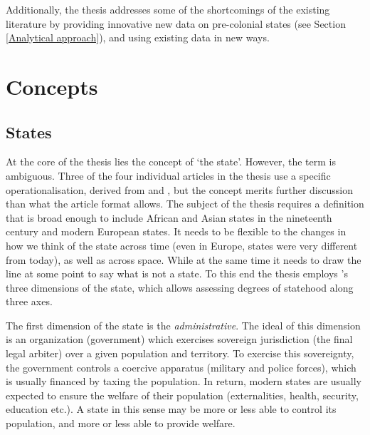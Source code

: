 Additionally, the thesis addresses some of the shortcomings of the existing
literature by providing innovative new data on pre-colonial states (see Section
\ref{Analytical approach}), and using existing data in new ways.

\section{Concepts} \label{Concepts}

\subsection{States} \label{States}

At the core of the thesis lies the concept of `the state'. However, the term is
ambiguous. Three of the four individual articles in the thesis use a specific
operationalisation, derived from \citet{Butcher2019} and \citet{Butcher2017},
but the concept merits further discussion than what the article format allows.
The subject of the thesis requires a definition that is broad enough to include
African and Asian states in the nineteenth century and modern European states.
It needs to be flexible to the changes in how we think of the state across time
(even in Europe, states were very different from today), as well as across
space. While at the same time it needs to draw the line at some point to say
what is not a state. To this end the thesis employs \citet{Clapham1996}'s three
dimensions of the state, which allows assessing degrees of statehood along three
axes.

The first dimension of the state is the \textit{administrative}. The ideal of
this dimension is an organization (government) which exercises sovereign
jurisdiction (the final legal arbiter) over a given population and territory. To
exercise this sovereignty, the government controls a coercive apparatus
(military and police forces), which is usually financed by taxing the
population. In return, modern states are usually expected to ensure the welfare
of their population (externalities, health, security, education etc.). A state
in this sense may be more or less able to control its population, and more or
less able to provide welfare.

